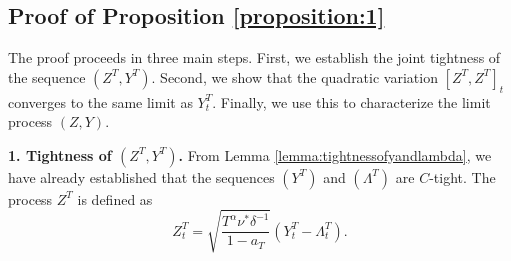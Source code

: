 \documentclass[letterpaper]{article}
\numberwithin{equation}{section}
\theoremstyle{definition}
\theoremstyle{remark}
\begin{document}
\subsection{Proof of Proposition \ref{proposition:1}}
\label{subsec:proofofproposition}

The proof proceeds in three main steps. First, we establish the joint tightness of the sequence $(Z^T, Y^T)$. Second, we show that the quadratic variation $[Z^T, Z^T]_t$ converges to the same limit as $Y^T_t$. Finally, we use this to characterize the limit process $(Z,Y)$.

\textbf{1. Tightness of $(Z^T, Y^T)$.}
From Lemma \ref{lemma:tightnessofyandlambda}, we have already established that the sequences $(Y^T)$ and $(\Lambda^T)$ are $C$-tight. The process $Z^T$ is defined as
\[
  Z_t^T = \sqrt{\frac{T^\alpha \nu^* \delta^{-1}}{1-a_T}} (Y_t^T - \Lambda_t^T).
\]
\end{document}

